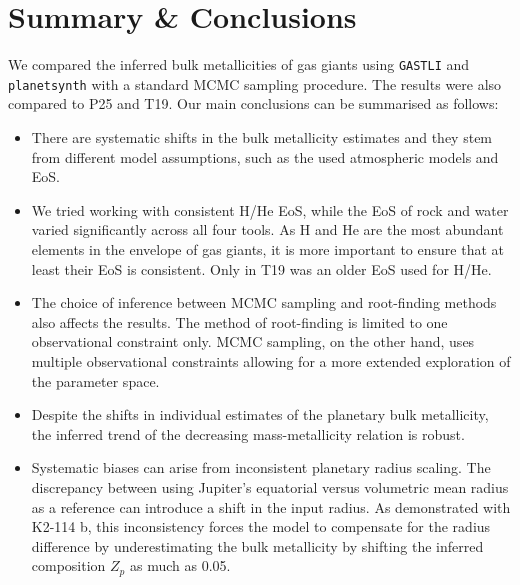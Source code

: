 \documentclass{aa}
\begin{document}
\section{Summary \& Conclusions}
We compared the inferred bulk metallicities of gas giants using \texttt{GASTLI} and \texttt{planetsynth} with a standard MCMC sampling procedure. The results were also compared to P25 and T19. Our main conclusions can be  summarised as follows:
\begin{itemize}
    \item{There are systematic shifts in the bulk metallicity estimates and they stem from different model assumptions, such as the used atmospheric models and EoS.}
    \item{We tried working with consistent H/He EoS, while the EoS of rock and water varied significantly across all four tools. As H and He are the most abundant elements in the envelope of gas giants, it is more important to ensure that at least their EoS is consistent. Only in T19 was an older EoS used for H/He.}
    \item{The choice of inference between MCMC sampling and root-finding methods also affects the results. The method of root-finding  is limited to one observational constraint only. MCMC sampling, on the other hand, uses multiple observational constraints allowing  for a more extended exploration of the parameter space.}
    \item{Despite the shifts in individual estimates of the planetary bulk metallicity, the inferred trend of the decreasing mass-metallicity relation is robust.}
    \item{Systematic biases can arise from inconsistent planetary radius scaling. The discrepancy between using Jupiter's equatorial versus volumetric mean radius as a reference can introduce a shift in the input radius. As demonstrated with K2-114 b, this inconsistency forces the model to compensate for the radius difference by underestimating the bulk metallicity by shifting the inferred composition $Z_p$ as much as 0.05.}
\end{itemize}
\end{document}
